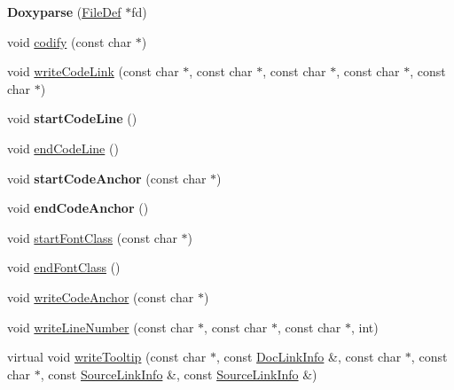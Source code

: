 \begin{DoxyCompactItemize}
\item 
\mbox{\label{class_doxyparse_a78bc8d2a1f2a77e1fe18529c91b9ba1b}} 
{\bfseries Doxyparse} (\mbox{\hyperlink{class_file_def}{File\+Def}} $\ast$fd)
\item 
void \mbox{\hyperlink{class_doxyparse_aefb4447f5ddd4f26acee9c076f826635}{codify}} (const char $\ast$)
\item 
void \mbox{\hyperlink{class_doxyparse_adfe22a536eefa84ac8de7dd3492a50b6}{write\+Code\+Link}} (const char $\ast$, const char $\ast$, const char $\ast$, const char $\ast$, const char $\ast$)
\item 
\mbox{\label{class_doxyparse_a8372feedd8c2674ee6b32f53459c5ebb}} 
void {\bfseries start\+Code\+Line} ()
\item 
void \mbox{\hyperlink{class_doxyparse_a57e49f80ef4f8765666507c060af4dd2}{end\+Code\+Line}} ()
\item 
\mbox{\label{class_doxyparse_a48a5e231116113f0b3ee66658139b4a8}} 
void {\bfseries start\+Code\+Anchor} (const char $\ast$)
\item 
\mbox{\label{class_doxyparse_af4f78b1f17aa0021e6c3bbfc0feed143}} 
void {\bfseries end\+Code\+Anchor} ()
\item 
void \mbox{\hyperlink{class_doxyparse_aa74b254b1e80ccf48d17acfa119e7704}{start\+Font\+Class}} (const char $\ast$)
\item 
void \mbox{\hyperlink{class_doxyparse_a3c7ba846a59b1aff41ab0395b2e6dd8f}{end\+Font\+Class}} ()
\item 
void \mbox{\hyperlink{class_doxyparse_a43aa79498085a47fcd0c122898133b20}{write\+Code\+Anchor}} (const char $\ast$)
\item 
void \mbox{\hyperlink{class_doxyparse_a882b6cff2abddabafbe010c231455c19}{write\+Line\+Number}} (const char $\ast$, const char $\ast$, const char $\ast$, int)
\item 
virtual void \mbox{\hyperlink{class_doxyparse_a1134b46ed49cafec27797aa1dc24fd25}{write\+Tooltip}} (const char $\ast$, const \mbox{\hyperlink{struct_doc_link_info}{Doc\+Link\+Info}} \&, const char $\ast$, const char $\ast$, const \mbox{\hyperlink{struct_source_link_info}{Source\+Link\+Info}} \&, const \mbox{\hyperlink{struct_source_link_info}{Source\+Link\+Info}} \&)
\item 

\end{DoxyCompactItemize}
